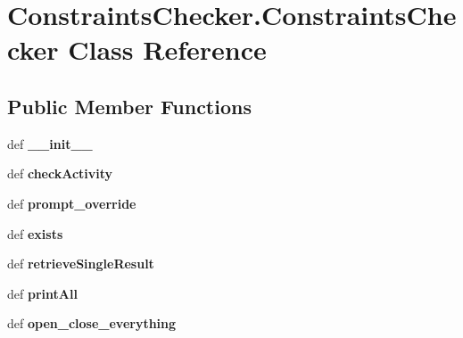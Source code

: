 \hypertarget{classConstraintsChecker_1_1ConstraintsChecker}{\section{Constraints\-Checker.\-Constraints\-Checker Class Reference}
\label{classConstraintsChecker_1_1ConstraintsChecker}
}
\subsection*{Public Member Functions}
\begin{DoxyCompactItemize}
\item 
\hypertarget{classConstraintsChecker_1_1ConstraintsChecker_aafea6f185c3fef070c72212aa3b103ac}{def {\bfseries \-\_\-\-\_\-init\-\_\-\-\_\-}}\label{classConstraintsChecker_1_1ConstraintsChecker_aafea6f185c3fef070c72212aa3b103ac}

\item 
\hypertarget{classConstraintsChecker_1_1ConstraintsChecker_ab9412dd06763ea9383dfe70fae661a4e}{def {\bfseries check\-Activity}}\label{classConstraintsChecker_1_1ConstraintsChecker_ab9412dd06763ea9383dfe70fae661a4e}

\item 
\hypertarget{classConstraintsChecker_1_1ConstraintsChecker_ab9b9ee65d1efe0902de050a9c045dd7e}{def {\bfseries prompt\-\_\-override}}\label{classConstraintsChecker_1_1ConstraintsChecker_ab9b9ee65d1efe0902de050a9c045dd7e}

\item 
\hypertarget{classConstraintsChecker_1_1ConstraintsChecker_a93c9a9093c04f97268a9f9f71dd220d0}{def {\bfseries exists}}\label{classConstraintsChecker_1_1ConstraintsChecker_a93c9a9093c04f97268a9f9f71dd220d0}

\item 
\hypertarget{classConstraintsChecker_1_1ConstraintsChecker_a60c0c8e82323c9ccb818f7a5f22fa49d}{def {\bfseries retrieve\-Single\-Result}}\label{classConstraintsChecker_1_1ConstraintsChecker_a60c0c8e82323c9ccb818f7a5f22fa49d}

\item 
\hypertarget{classConstraintsChecker_1_1ConstraintsChecker_a95aa9feb78817ee9a7aacf2c0ccddd25}{def {\bfseries print\-All}}\label{classConstraintsChecker_1_1ConstraintsChecker_a95aa9feb78817ee9a7aacf2c0ccddd25}

\item 
\hypertarget{classConstraintsChecker_1_1ConstraintsChecker_aa1148ff1bb81feb170a0ea84e520ebc0}{def {\bfseries open\-\_\-close\-\_\-everything}}\label{classConstraintsChecker_1_1ConstraintsChecker_aa1148ff1bb81feb170a0ea84e520ebc0}

\end{DoxyCompactItemize}
